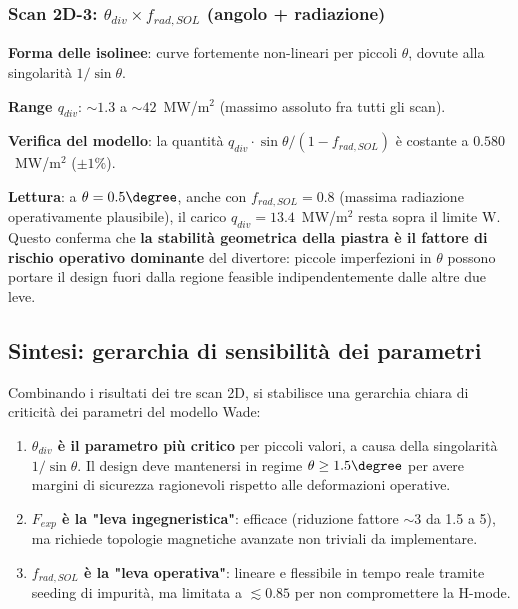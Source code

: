 \subsubsection{Scan 2D-3: $\theta_{div} \times f_{rad,SOL}$
               (angolo + radiazione)}

\textbf{Forma delle isolinee}: curve fortemente non-lineari per piccoli
$\theta$, dovute alla singolarità $1/\sin\theta$.

\textbf{Range $q_{div}$}: $\sim 1.3$ a $\sim 42$~MW/m$^2$ (massimo
assoluto fra tutti gli scan).

\textbf{Verifica del modello}: la quantità
$q_{div} \cdot \sin\theta / (1 - f_{rad,SOL})$ è costante a
$0.580$~MW/m$^2$ ($\pm 1\%$).

\textbf{Lettura}: a $\theta = 0.5\degree$, anche con $f_{rad,SOL} = 0.8$
(massima radiazione operativamente plausibile), il carico
$q_{div} = 13.4$~MW/m$^2$ resta sopra il limite W. Questo conferma che
\textbf{la stabilità geometrica della piastra è il fattore di rischio
operativo dominante} del divertore: piccole imperfezioni in $\theta$
possono portare il design fuori dalla regione feasible indipendentemente
dalle altre due leve.

\subsection{Sintesi: gerarchia di sensibilità dei parametri}

Combinando i risultati dei tre scan 2D, si stabilisce una gerarchia chiara
di criticità dei parametri del modello Wade:

\begin{enumerate}
    \item \textbf{$\theta_{div}$ è il parametro più critico} per piccoli
          valori, a causa della singolarità $1/\sin\theta$. Il design
          deve mantenersi in regime $\theta \ge 1.5\degree$ per avere
          margini di sicurezza ragionevoli rispetto alle deformazioni
          operative.
    \item \textbf{$F_{exp}$ è la "leva ingegneristica"}: efficace
          (riduzione fattore $\sim 3$ da 1.5 a 5), ma richiede topologie
          magnetiche avanzate non triviali da implementare.
    \item \textbf{$f_{rad,SOL}$ è la "leva operativa"}: lineare e
          flessibile in tempo reale tramite seeding di impurità, ma
          limitata a $\lesssim 0.85$ per non compromettere la H-mode.
\end{enumerate}

